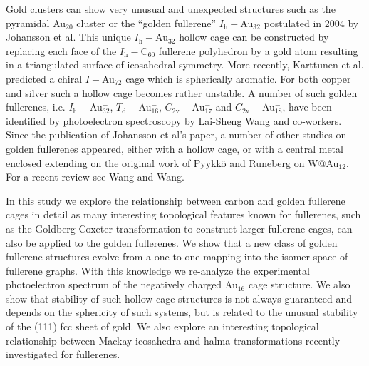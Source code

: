 Gold clusters can show very unusual and unexpected structures such as the
pyramidal Au$_{20}$
cluster\autocite{Li-2003,Fielicke-2008,Assadollahzadeh_systematicsearchminimum_2009}
or the ``golden fullerene'' $I_\mathrm{h}-$Au$_{32}$ postulated in 2004 by Johansson et
al.\autocite{Johansson_Au3224CaratGolden_2004} This unique $I_\mathrm{h}-$Au$_{32}$
hollow cage can be constructed by replacing each face of the $I_\mathrm{h}-$C$_{60}$
fullerene polyhedron by a gold atom resulting in a triangulated surface of
icosahedral symmetry.\autocite{Johansson_Au3224CaratGolden_2004} More recently,
Karttunen et al. predicted a chiral $I-$Au$_{72}$ cage which is spherically
aromatic.\autocite{Karttunen_IcosahedralAu72_2008} For both copper and silver
such a hollow cage becomes rather
unstable.\autocite{Johansson_Au3224CaratGolden_2004,Fernandez-2006a} A number
of such golden fullerenes, i.e. $I_\mathrm{h}-$Au$_{32}^-$, $T_\mathrm{d}-$Au$_{16}^-$,
$C_\mathrm{2v}-$Au$_\mathrm{17}^-$ and $C_\mathrm{2v}-$Au$_{18}^-$, have been identified by
photoelectron spectroscopy by Lai-Sheng Wang and
co-workers.\autocite{Ji-2005,Bulusu_Evidencehollowgolden_2006} Since the
publication of Johansson et al's
paper\autocite{Johansson_Au3224CaratGolden_2004}, a number of other studies on
golden fullerenes appeared, either with a hollow
cage,\autocite{Gu-2004,Fernandez-2006,Fa-Dong-2006,Fa-Zhou-2006,Karttunen_IcosahedralAu72_2008,Fa-Luong-2008,Chen_Structuresneutralanionic_2010,Tian-2011,De-2012,Ning-2014,Joshi-2015}
or with a central metal
enclosed\autocite{Autschbach_PropertiesWAu12_2004,Zhai-2004,Gao-Bulusu-2005,Wang_Dopinggoldencage_2007,Wang_DopingGoldenBuckyballs_2007,Fa-Dong-2008a,Munoz-2013,Manna-2013,Tang-2013}
extending on the original work of Pyykk\"o and Runeberg on
W@Au$_{12}$.\autocite{Pyykko_IcosahedralWAu12Predicted_2002,Li_Experimentalobservationconfirmation_2002}
For a recent review see Wang and Wang.\autocite{Wang-Wang-2012}

In this study we explore the relationship between carbon and golden fullerene
cages in detail as many interesting topological features known for
fullerenes,\autocite{Cataldo-Ori-2011,Schwerdtfeger_topologyfullerenes_2015}
such as the Goldberg-Coxeter transformation to construct larger fullerene
cages,\autocite{Goldberg_ClassMultiSymmetricPolyhedra_1937,Coxeter-1971} can
also be applied to the golden fullerenes. We show that a new class of golden
fullerene structures evolve from a one-to-one mapping into the isomer space of
fullerene graphs. With this knowledge we re-analyze the experimental
photoelectron spectrum of the negatively charged Au$_{16}^-$ cage structure. We
also show that stability of such hollow cage structures is not always
guaranteed and depends on the sphericity of such systems, but is related to the
unusual stability of the (111) fcc sheet of gold. We also explore an
interesting topological relationship between Mackay icosahedra and halma
transformations recently investigated for
fullerenes.\autocite{Schwerdtfeger_topologyfullerenes_2015}

